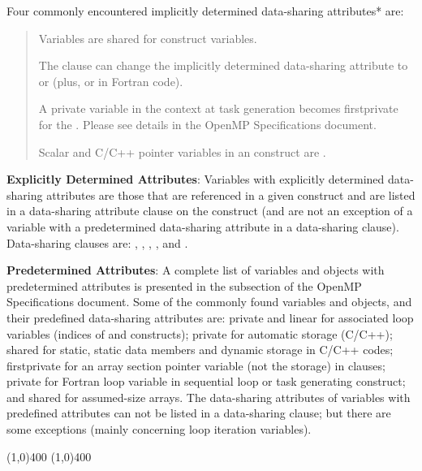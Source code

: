 Four commonly encountered implicitly determined data-sharing attributes* are:
\begin{quote}
         Variables are shared for  construct variables.

         The  clause can change the implicitly determined
         data-sharing attribute to  or 
         (plus,  or  in Fortran code).

         A private variable in the context at task 
         generation becomes firstprivate for the .
         Please see details in the OpenMP Specifications document.

         Scalar and C/C++ pointer variables in an  
         construct are .
\end{quote}

\textbf{Explicitly Determined Attributes}:\newline
Variables with explicitly determined data-sharing attributes are those that are
referenced in a given construct and are listed in a data-sharing attribute
clause on the construct (and are not an exception of a variable with
a predetermined data-sharing attribute in a data-sharing clause). 
Data-sharing clauses are: , ,
, , and .

\textbf{Predetermined Attributes}:\newline
A complete list of variables and objects with predetermined attributes is
presented in the
subsection of the OpenMP Specifications document.  
Some of the commonly found variables and objects, and their predefined data-sharing attributes are:
private and linear for associated loop variables (indices of 
and  constructs);  private for automatic storage (C/C++); shared for
static, static data members and dynamic storage in C/C++ codes; firstprivate
for an array section pointer variable (not the storage) in  clauses;
private for Fortran loop variable in sequential loop or task generating construct;
and shared for assumed-size arrays.
The data-sharing attributes of variables with predefined
attributes can not be listed in a data-sharing clause; but there are some
exceptions (mainly concerning loop iteration variables).

\line(1,0){400}
\line(1,0){400}

